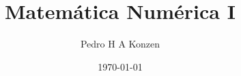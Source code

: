 \documentclass[12pt]{book}
\begin{document}
\frontmatter

\title{Matemática Numérica I}
\author{Pedro H A Konzen}
\date{\today}
\ifishtml
\else
{}
\fi

\maketitle

\nocite{Bjorck1996a,
  Burden2016a,
  Isaacson1994a,
  Lemire2021a,
  Nocedal2006a,
  Press2007a,
  Stoer1993a}




\tableofcontents
{}

\mainmatter

%



% 





\ifisbook

\fi

\nocite{*}


\ifisbook
\clearpage
{}
\printindex
\fi
\end{document}

